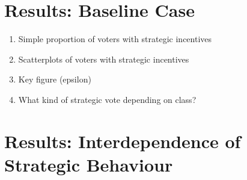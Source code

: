 \documentclass[11pt, letter]{article}
\begin{document}
\section{Results: Baseline Case}

\begin{enumerate}
\item Simple proportion of voters with strategic incentives
\item Scatterplots of voters with strategic incentives
\item Key figure (epsilon)
\item What kind of strategic vote depending on class?
\end{enumerate}

\section{Results: Interdependence of Strategic Behaviour}
\end{document}
